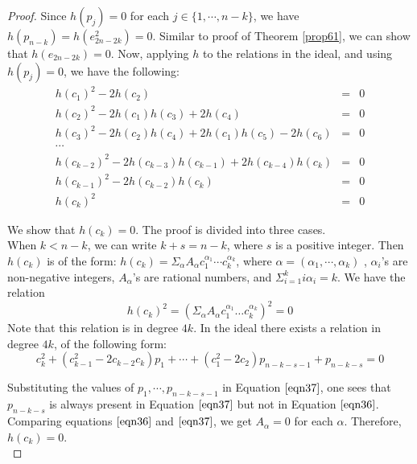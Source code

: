 \documentclass[a4paper,leqno,12pt]{amsart}
\theoremstyle{plain}
\theoremstyle{definition}
\theoremstyle{remark}
\begin{document}
{ \begin{proof}
 Since $h(p_{j})= 0$ for each $j \in \{1,  \cdots , n-k \}$,  we have $h(p_{n-k}) = h(e_{2n-2k}^{2}) =0$.  Similar to proof of Theorem \ref{prop61},  we can show that $h(e_{2n-2k}) = 0$.  Now,  applying $h$ to the relations in the ideal,  and using $h(p_{j}) =0$,  we have the following: 
 \begin{eqnarray}
    h(c_{1})^{2}-2h(c_{2}) &=&0  \nonumber \\
    h(c_{2})^{2}- 2h(c_{1})h(c_{3})+2h(c_{4})&=& 0 \nonumber  \\
    h(c_{3})^{2}-2h(c_{2})h(c_{4})+2h(c_{1})h(c_{5})-2h(c_{6}) &=& 0 \nonumber \\
    \cdots  \nonumber \\
    h(c_{k-2})^{2}- 2h(c_{k-3})h(c_{k-1})+ 2h(c_{k-4})h(c_{k}) &=& 0 \nonumber \\
    h(c_{k-1})^{2}-2h(c_{k-2})h(c_{k}) &=& 0 \nonumber \\
    h(c_{k})^{2}&=&0 \nonumber
\end{eqnarray}

\noindent
We show that  $h(c_{k}) =0$.  The proof is divided into three cases.  \\
\noindent
When $k <n-k$,   we can write $k+s = n-k$,  where $s$ is a positive integer. Then $h(c_{k})$ is of the form: 
$h(c_{k}) = \Sigma_{\alpha} A_{\alpha} c_{1}^{\alpha_{1}} \cdots c_{k}^{\alpha_{k}} $,  
where $\alpha = (\alpha_{1} ,  \cdots ,  \alpha_{k})$ ,  $\alpha_{i}$'s are non-negative integers,  $A_{\alpha}$'s are rational numbers,  and $\Sigma_{i=1}^{k} i \alpha_{i} = k$.    We have the relation 
\begin{equation}
 \label{eqn36}
    h(c_{k})^{2}= (\Sigma_{\alpha} A_{\alpha} c_{1}^{\alpha_{1}}\dots c_{k}^{\alpha_{k}})^{2} = 0
\end{equation}
\noindent
Note that this relation is in degree $4k$.  In the  ideal  there exists a relation in degree $4k$,  of the following form: 
\begin{equation}
 \label{eqn37}
    c_{k}^{2}+(c_{k-1}^{2}-2c_{k-2}c_{k})p_{1}+ \cdots +(c_{1}^{2}-2c_{2})p_{n-k-s-1}+p_{n-k-s}=0
\end{equation}

\noindent
Substituting the values of $p_{1},  \cdots,  p_{n-k-s-1}$ in Equation $\ref{eqn37}$,  one sees that $p_{n-k-s}$ is always present in Equation $\ref{eqn37}$ but not in Equation $\ref{eqn36}$.   Comparing equations $\ref{eqn36}$ and $\ref{eqn37}$,  we get $A_{\alpha}=0$ for each $\alpha$.   Therefore,   $h(c_{k})=0$.\\  


\end{proof}}
\end{document}
